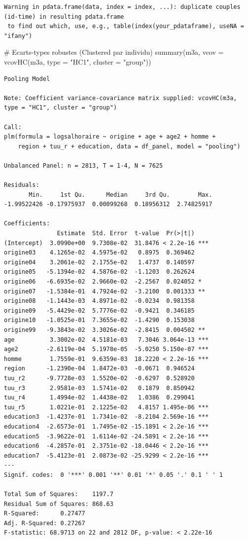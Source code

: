 \documentclass[
  letterpaper,
  DIV=11,
  numbers=noendperiod]{scrartcl}
\newenvironment{Shaded}{\begin{snugshade}}{\end{snugshade}}
\newcommand{\AttributeTok}[1]{\textcolor[rgb]{0.40,0.45,0.13}{#1}}
\newcommand{\CommentTok}[1]{\textcolor[rgb]{0.37,0.37,0.37}{#1}}
\newcommand{\FunctionTok}[1]{\textcolor[rgb]{0.28,0.35,0.67}{#1}}
\newcommand{\NormalTok}[1]{\textcolor[rgb]{0.00,0.23,0.31}{#1}}
\newcommand{\StringTok}[1]{\textcolor[rgb]{0.13,0.47,0.30}{#1}}
\begin{document}
\begin{verbatim}
Warning in pdata.frame(data, index = index, ...): duplicate couples (id-time) in resulting pdata.frame
 to find out which, use, e.g., table(index(your_pdataframe), useNA = "ifany")
\end{verbatim}

\begin{Shaded}
\begin{Highlighting}[]
\CommentTok{\# Ecarts{-}types robustes (Clustered par individu)}
\FunctionTok{summary}\NormalTok{(m3a, }\AttributeTok{vcov =} \FunctionTok{vcovHC}\NormalTok{(m3a, }\AttributeTok{type =} \StringTok{"HC1"}\NormalTok{, }\AttributeTok{cluster =} \StringTok{"group"}\NormalTok{))}
\end{Highlighting}
\end{Shaded}

\begin{verbatim}
Pooling Model

Note: Coefficient variance-covariance matrix supplied: vcovHC(m3a, type = "HC1", cluster = "group")

Call:
plm(formula = logsalhoraire ~ origine + age + age2 + homme + 
    region + tuu_r + education, data = df_panel, model = "pooling")

Unbalanced Panel: n = 2813, T = 1-4, N = 7625

Residuals:
       Min.     1st Qu.      Median     3rd Qu.        Max. 
-1.99522426 -0.17975937  0.00099268  0.18956312  2.74825917 

Coefficients:
               Estimate  Std. Error  t-value  Pr(>|t|)    
(Intercept)  3.0990e+00  9.7308e-02  31.8476 < 2.2e-16 ***
origine03    4.1265e-02  4.5975e-02   0.8975  0.369462    
origine04    3.2061e-02  2.1755e-02   1.4737  0.140597    
origine05   -5.1394e-02  4.5876e-02  -1.1203  0.262624    
origine06   -6.6935e-02  2.9660e-02  -2.2567  0.024052 *  
origine07   -1.5384e-01  4.7924e-02  -3.2100  0.001333 ** 
origine08   -1.1443e-03  4.8971e-02  -0.0234  0.981358    
origine09   -5.4429e-02  5.7776e-02  -0.9421  0.346185    
origine10   -1.0525e-01  7.3655e-02  -1.4290  0.153038    
origine99   -9.3843e-02  3.3026e-02  -2.8415  0.004502 ** 
age          3.3002e-02  4.5181e-03   7.3046 3.064e-13 ***
age2        -2.6119e-04  5.1978e-05  -5.0250 5.150e-07 ***
homme        1.7559e-01  9.6359e-03  18.2220 < 2.2e-16 ***
region      -1.2390e-04  1.8472e-03  -0.0671  0.946524    
tuu_r2      -9.7728e-03  1.5520e-02  -0.6297  0.528920    
tuu_r3       2.9581e-03  1.5741e-02   0.1879  0.850942    
tuu_r4       1.4994e-02  1.4438e-02   1.0386  0.299041    
tuu_r5       1.0221e-01  2.1225e-02   4.8157 1.495e-06 ***
education3  -1.4237e-01  1.7341e-02  -8.2104 2.569e-16 ***
education4  -2.6573e-01  1.7495e-02 -15.1891 < 2.2e-16 ***
education5  -3.9622e-01  1.6114e-02 -24.5891 < 2.2e-16 ***
education6  -4.2857e-01  2.3751e-02 -18.0446 < 2.2e-16 ***
education7  -5.4123e-01  2.0873e-02 -25.9299 < 2.2e-16 ***
---
Signif. codes:  0 '***' 0.001 '**' 0.01 '*' 0.05 '.' 0.1 ' ' 1

Total Sum of Squares:    1197.7
Residual Sum of Squares: 868.63
R-Squared:      0.27477
Adj. R-Squared: 0.27267
F-statistic: 68.9713 on 22 and 2812 DF, p-value: < 2.22e-16
\end{verbatim}
\end{document}
